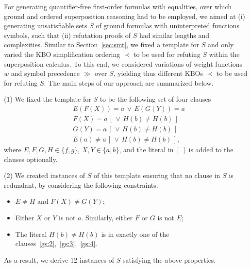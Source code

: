 For generating quantifier-free first-order formulas with equalities,
over which ground and ordered superposition reasoning had to be employed, we
aimed at (i)  generating  unsatisfiable sets $S$ of ground formulas with
uninterpreted functions symbols, such that (ii)  refutation proofs
of $S$ had similar lengths and complexities. Similar to
Section~\ref{sec:smt}, we fixed a template for $S$  and only varied
the KBO simplification ordering $\prec$ to be used for refuting  $S$
within the superposition calculus. To this end, we considered
variations of weight functions $w$ and symbol precedence $\gg$ over $S$,
yielding thus different KBOs $\prec$ to be used for refuting $S$.
The main steps of our approach are summarized below.\smallskip

\noindent(1) We fixed the template for $S$ to be the following set of four clauses
\begin{align}
  &E(F(X)) = a \,\lor\, E(G(Y)) = a \label{gs:1} \\
  &F(X) = a \,[\, \lor\, H(b) \not= H(b) \,] \label{gs:2} \\
  &G(Y) = a \,[\, \lor\, H(b) \not= H(b) \,] \label{gs:3} \\
  &E(a) \not= a \,[\, \lor\, H(b) \not= H(b) \,] \label{gs:4},
\end{align}
where $E, F, G, H \in \{f, g\}$, $X, Y \in \{a, b\}$, and the literal
in $[~]$ is added to the clauses optionally.\smallskip


\noindent(2)
We created
instances of $S$ of this template ensuring that no clause in $S$ is
redundant, by considering the following constraints.
\begin{itemize}
  \item $E \not = H$ and $F(X) \not = G(Y)$;
  \item Either $X$ or $Y$ is not $a$. Similarly, either $F$ or $G$ is not $E$;
  \item The literal $H(b) \not = H(b)$ is in exactly one of the
    clauses~\eqref{gs:2},~\eqref{gs:3},~\eqref{gs:4}.
\end{itemize}
As a result, we derive 12 instances of $S$ satisfying the above properties.\smallskip
%

